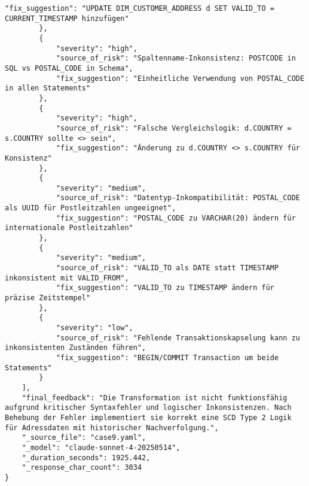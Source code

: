 \begin{lstlisting}[caption={Ausgabe: Claude Sonnet 4 Anwendungsfall 9 Konsistenzdurchlauf},label={claude_case9_prompt2}]
            "fix_suggestion": "UPDATE DIM_CUSTOMER_ADDRESS d SET VALID_TO = CURRENT_TIMESTAMP hinzufügen"
        },
        {
            "severity": "high",
            "source_of_risk": "Spaltenname-Inkonsistenz: POSTCODE in SQL vs POSTAL_CODE in Schema",
            "fix_suggestion": "Einheitliche Verwendung von POSTAL_CODE in allen Statements"
        },
        {
            "severity": "high",
            "source_of_risk": "Falsche Vergleichslogik: d.COUNTRY = s.COUNTRY sollte <> sein",
            "fix_suggestion": "Änderung zu d.COUNTRY <> s.COUNTRY für Konsistenz"
        },
        {
            "severity": "medium",
            "source_of_risk": "Datentyp-Inkompatibilität: POSTAL_CODE als UUID für Postleitzahlen ungeeignet",
            "fix_suggestion": "POSTAL_CODE zu VARCHAR(20) ändern für internationale Postleitzahlen"
        },
        {
            "severity": "medium",
            "source_of_risk": "VALID_TO als DATE statt TIMESTAMP inkonsistent mit VALID_FROM",
            "fix_suggestion": "VALID_TO zu TIMESTAMP ändern für präzise Zeitstempel"
        },
        {
            "severity": "low",
            "source_of_risk": "Fehlende Transaktionskapselung kann zu inkonsistenten Zuständen führen",
            "fix_suggestion": "BEGIN/COMMIT Transaction um beide Statements"
        }
    ],
    "final_feedback": "Die Transformation ist nicht funktionsfähig aufgrund kritischer Syntaxfehler und logischer Inkonsistenzen. Nach Behebung der Fehler implementiert sie korrekt eine SCD Type 2 Logik für Adressdaten mit historischer Nachverfolgung.",
    "_source_file": "case9.yaml",
    "_model": "claude-sonnet-4-20250514",
    "_duration_seconds": 1925.442,
    "_response_char_count": 3034
}
\end{lstlisting}

